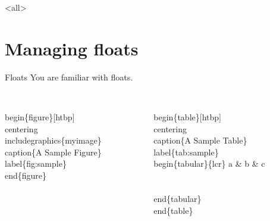 \mode<all>
\overleaf
\mode*

\section{Managing floats}

\begin{frame}[fragile]{Floats}
	You are familiar with floats.
    \begin{columns}[t]
	  \begin{column}{.45\textwidth}
		\begin{semiverbatim}
		  \alert<2>{\\begin\{figure\}[htbp]}
		  \\centering
		  \\includegraphics\{myimage\}
		  \\caption\{A Sample Figure\}
		  \\label\{fig:sample\}
		  \alert<2>{\\end\{figure\}}
		\end{semiverbatim}
	  \end{column}
	  \begin{column}{.45\textwidth}
		\begin{semiverbatim}
		  \alert<2>{\\begin\{table\}[htbp]}
		  \\centering
		  \\caption\{A Sample Table\}
		  \\label\{tab:sample\}
		  \\begin\{tabular\}\{lcr\}
		    a & b & c\\\\
		  \\end\{tabular\}
		  \alert<2>{\\end\{table\}}
		\end{semiverbatim}
	  \end{column}
	\end{columns}
\end{frame}

